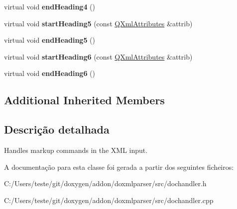 \begin{DoxyCompactItemize}
\item 
\hypertarget{class_markup_handler_a2c181b1e88a2bd36f341a7f632043525}{virtual void {\bfseries end\-Heading4} ()}\label{class_markup_handler_a2c181b1e88a2bd36f341a7f632043525}

\item 
\hypertarget{class_markup_handler_a6feeb7aa0d7032dc0542a1ea28453d4b}{virtual void {\bfseries start\-Heading5} (const \hyperlink{class_q_xml_attributes}{Q\-Xml\-Attributes} \&attrib)}\label{class_markup_handler_a6feeb7aa0d7032dc0542a1ea28453d4b}

\item 
\hypertarget{class_markup_handler_a49544515a0d978e7f63e330fc2fb1dcc}{virtual void {\bfseries end\-Heading5} ()}\label{class_markup_handler_a49544515a0d978e7f63e330fc2fb1dcc}

\item 
\hypertarget{class_markup_handler_ab5f95c0f322515e5bcc1bd63b2dee0bd}{virtual void {\bfseries start\-Heading6} (const \hyperlink{class_q_xml_attributes}{Q\-Xml\-Attributes} \&attrib)}\label{class_markup_handler_ab5f95c0f322515e5bcc1bd63b2dee0bd}

\item 
\hypertarget{class_markup_handler_a6e4b7c736cfc129267fd6e1bcc1a5de0}{virtual void {\bfseries end\-Heading6} ()}\label{class_markup_handler_a6e4b7c736cfc129267fd6e1bcc1a5de0}

\end{DoxyCompactItemize}
\subsection*{Additional Inherited Members}


\subsection{Descrição detalhada}
Handles markup commands in the X\-M\-L input. 



A documentação para esta classe foi gerada a partir dos seguintes ficheiros\-:\begin{DoxyCompactItemize}
\item 
C\-:/\-Users/teste/git/doxygen/addon/doxmlparser/src/dochandler.\-h\item 
C\-:/\-Users/teste/git/doxygen/addon/doxmlparser/src/dochandler.\-cpp\end{DoxyCompactItemize}
